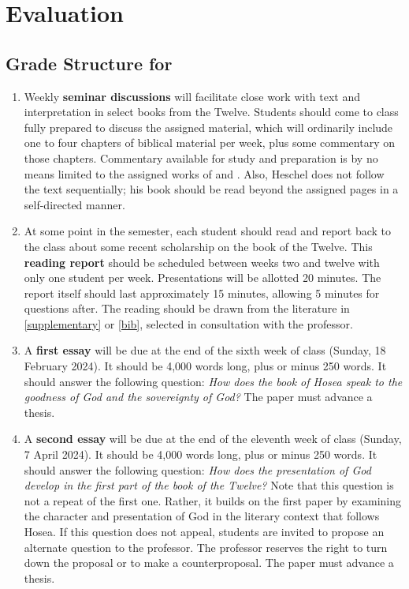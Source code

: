 \documentclass[titlepage]{article}
\begin{document}
\section{Evaluation}
\label{evaluation}

\subsection{Grade Structure for \ccode}
\label{structure}

\begin{enumerate}

	\item Weekly \textbf{seminar discussions} will facilitate close work
	with text and interpretation in select books from the Twelve.
	Students should come to class fully prepared to discuss the assigned
	material, which will ordinarily include one to four chapters of
	biblical material per week, plus some commentary on those chapters.
	Commentary available for study and preparation is by no means
	limited to the assigned works of \cite{Theodoret} and
	\cite{Heschel}. Also, Heschel does not follow the text sequentially;
	his book should be read beyond the assigned pages in a self-directed
	manner.

	\item At some point in the semester, each student should read and
	report back to the class about some recent scholarship on the book
	of the Twelve. This \textbf{reading report} should be scheduled
	between weeks two and twelve with only one student per week.
	Presentations will be allotted 20 minutes. The report itself should
	last approximately 15 minutes, allowing 5 minutes for questions
	after. The reading should be drawn from the literature in
	\autoref{supplementary} or \autoref{bib}, selected in consultation
	with the professor. 

	\item A \textbf{first essay} will be due at the end of the sixth
	week of class (Sunday, 18 February 2024). It should be 4,000 words
	long, plus or minus 250 words. It should answer the following
	question: \emph{How does the book of Hosea speak to the goodness of
	God and the sovereignty of God?} The paper must advance a thesis.

	\item A \textbf{second essay} will be due at the end of the eleventh
	week of class (Sunday, 7 April 2024). It should be 4,000 words long,
	plus or minus 250 words. It should answer the following question:
	\emph{How does the presentation of God develop in the first part of
	the book of the Twelve?} Note that this question is not a repeat of
	the first one. Rather, it builds on the first paper by examining the
	character and presentation of God in the literary context that
	follows Hosea. If this question does not appeal, students are
	invited to propose an alternate question to the professor. The
	professor reserves the right to turn down the proposal or to make a
	counterproposal. The paper must advance a thesis.
	
\end{enumerate}
\end{document}
